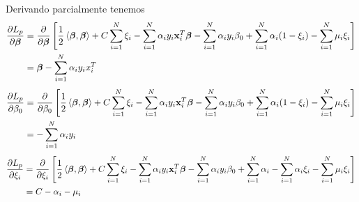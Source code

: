 \documentclass[letterpaper,12pt,oneside]{book}
\newcommand{\inprod}[2]{\left<#1, #2\right>} %
\begin{document}
{{{        Derivando parcialmente tenemos 
        \begin{align}
            \frac{\partial L_p}{\partial \boldsymbol{\beta}} &= \frac{\partial}{\partial \boldsymbol{\beta}} \left[ \frac{1}{2} \inprod{\boldsymbol{\beta}}{\boldsymbol{\beta}} + C \sum_{i=1}^{N} \xi_i - \sum_{i=1}^{N} \alpha_i  y_i \mathbf{x}_i^T \boldsymbol{\beta}- \sum_{i=1}^{N} \alpha_i  y_i\beta_0 + \sum_{i=1}^{N}\alpha_i(1 - \xi_i)  - \sum_{i=1}^{N} \mu_i \xi_i \right] \notag\\
            &= \boldsymbol{\beta}- \sum_{i=1}^{N} \alpha_i  y_i x_i^T \label{eq: parcial beta}
        \end{align} 
        \begin{align}
            \frac{\partial L_p}{\partial \beta_0} &= \frac{\partial}{\partial \beta_0} \left[ \frac{1}{2} \inprod{\boldsymbol{\beta}}{\boldsymbol{\beta}} + C \sum_{i=1}^{N} \xi_i - \sum_{i=1}^{N} \alpha_i  y_i \mathbf{x}_i^T \boldsymbol{\beta} - \sum_{i=1}^{N} \alpha_i  y_i\beta_0 + \sum_{i=1}^{N}\alpha_i(1 - \xi_i)  - \sum_{i=1}^{N} \mu_i \xi_i \right] \notag\\
            &= -\sum_{i=1}^{N} \alpha_i  y_i \label{eq: parcial beta cero}
        \end{align}
         \begin{align}
            \frac{\partial L_p}{\partial\xi_i} &= \frac{\partial}{\partial \xi_i} \left[ \frac{1}{2} \inprod{\boldsymbol{\beta}}{\boldsymbol{\beta}} + C \sum_{i=1}^{N} \xi_i - \sum_{i=1}^{N} \alpha_i  y_i \mathbf{x}_i^T \boldsymbol{\beta} - \sum_{i=1}^{N} \alpha_i  y_i\beta_0 + \sum_{i=1}^{N}\alpha_i -\sum_{i=1}^{N}\alpha_i \xi_i  - \sum_{i=1}^{N} \mu_i \xi_i \right] \notag\\
            &= C-\alpha_i-\mu_i \label{eq: parcial xi i}
        \end{align}
    
}}}
\end{document}
